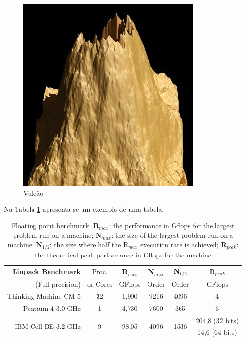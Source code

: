 \begin{figure}
 \centering
 \includegraphics[width=0.5\linewidth]{imgs/tp45a_450}
 \caption{Vulcão}
 \label{fig:vulcao}
\end{figure}


Na Tabela \ref{tableBenchmark} apresenta-se um exemplo de uma tabela.

\begin{table}
  \caption[Exemplo de uma tabela]{Floating point benchmark.
	\textbf{R$_{max}$}: the performance in Gflops for the largest problem run on a machine;
	\textbf{N$_{max}$}: the size of the largest problem run on a machine;
	\textbf{N$_{1/2}$}: the size where half the R$_{max}$ execution rate is achieved;
	\textbf{R$_{peak}$}: the theoretical peak performance in Gflops for the machine}
  \label{tableBenchmark}
  \begin{center} 
  \begin{tabular*}{1\textwidth}{@{\extracolsep{\fill}} rccccc } \toprule
\textbf{Linpack	Benchmark}& Proc.	& \textbf{R$_{max}$} & \textbf{N$_{max}$} & \textbf{N$_{1/2}$}	& \textbf{R$_{peak}$} \\ 
(Full precision)	& or Cores	& GFlops	     & Order		  & Order		& GFlops \\ [0.25ex] \midrule
Thinking Machine CM-5	& 32		& 1,900		     & 9216		  & 4096		& 4 \\
Pentium 4 3.0 GHz & 1	& 4,730		     & 7600		  & 365			& 6 \\
\multirow{2}{*}{IBM Cell BE 3.2 GHz} 	& \multirow{2}{*}{9}& \multirow{2}{*}{98,05} & \multirow{2}{*}{4096} & \multirow{2}{*}{1536} & 204,8 {\scriptsize{(32 bits)}} \\
			&		&		     &			  &			& 14,6 {\scriptsize{(64 bits)}} \\ \bottomrule
  \end{tabular*}
  \end{center}	
\end{table}
